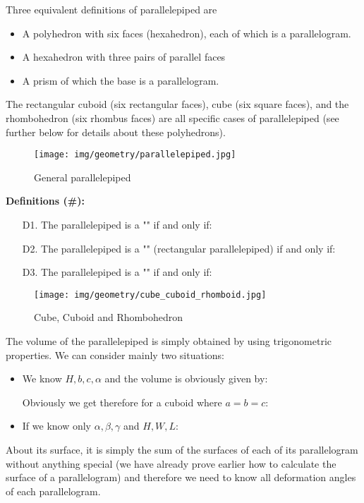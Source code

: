 {	Three equivalent definitions of parallelepiped are
	\begin{itemize}
		\item A polyhedron with six faces (hexahedron), each of which is a parallelogram.
	
		\item A hexahedron with three pairs of parallel faces
		
		\item A prism of which the base is a parallelogram.
	\end{itemize}
	The rectangular cuboid (six rectangular faces), cube (six square faces), and the rhombohedron (six rhombus faces) are all specific cases of parallelepiped (see further below for details about these polyhedrons).
	
	\begin{figure}[H]
		\centering
		\texttt{[image: img/geometry/parallelepiped.jpg]}
		\caption{General parallelepiped}
	\end{figure}
	\textbf{Definitions (\#\mydef):}
	\begin{itemize}
		\item[D1.] The parallelepiped is a "" if and only if:
		
		\item[D2.] The parallelepiped is a "" (rectangular parallelepiped) if and only if:
		
		\item[D3.] The parallelepiped is a ""  if and only if:
		
	\end{itemize}
	\begin{figure}[H]
		\centering
		\texttt{[image: img/geometry/cube\_cuboid\_rhomboid.jpg]}
		\caption{Cube, Cuboid and Rhombohedron}
	\end{figure}
	
	\pagebreak
	The volume of the parallelepiped is simply obtained by using trigonometric properties. We can consider mainly two situations:
	\begin{itemize}
		\item We know $H,b,c,\alpha$ and the volume is obviously given by:
		
		Obviously we get therefore for a cuboid where $a=b=c$:
		
		\item  If we know only $\alpha,\beta,\gamma$ and $H,W,L$:
		
	\end{itemize}
	About its surface, it is simply the sum of the surfaces of each of its parallelogram without anything special (we have already prove earlier how to calculate the surface of a parallelogram) and therefore we need to know all deformation angles of each parallelogram.
	
}
